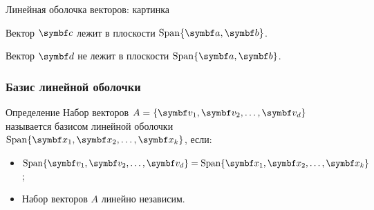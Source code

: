 \begin{frame}{Линейная оболочка векторов: картинка}
\begin{center}
  \end{center}
  
Вектор $\bc$ лежит в плоскости $\Span\{ \ba, \bb \}$.

Вектор $\bd$ не лежит в плоскости $\Span\{ \ba, \bb \}$.


\end{frame}



\begin{frame}
\frametitle{Базис линейной оболочки}


\begin{block}{Определение}
Набор векторов $A = \{\bv_1, \bv_2, \ldots, \bv_d \}$ называется
\alert{базисом линейной оболочки} $\Span\{\bx_1, \bx_2, \ldots, \bx_k \}$,
если:
\begin{itemize}
  \item $\Span\{\bv_1, \bv_2, \ldots, \bv_d \} =  \Span\{\bx_1, \bx_2, \ldots, \bx_k \}$;
  \item Набор векторов $A$ линейно независим.
\end{itemize}
\end{block}

\end{frame}





